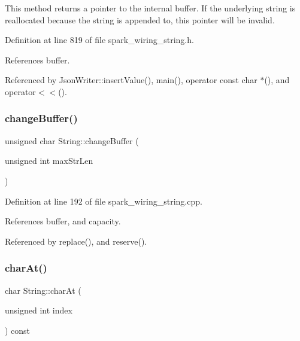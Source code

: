 This method returns a pointer to the internal buffer. If the underlying string is reallocated because the string is appended to, this pointer will be invalid. 

Definition at line 819 of file spark\+\_\+wiring\+\_\+string.\+h.



References buffer.



Referenced by Json\+Writer\+::insert\+Value(), main(), operator const char $\ast$(), and operator$<$$<$().

\mbox{\label{class_string_aea30ddc42b0dd5434d23606c39580e5d}} 
\subsubsection{\texorpdfstring{change\+Buffer()}{changeBuffer()}}
{\footnotesize\ttfamily unsigned char String\+::change\+Buffer (\begin{DoxyParamCaption}\item[{unsigned int}]{max\+Str\+Len }\end{DoxyParamCaption})\hspace{0.3cm}{\ttfamily [protected]}}



Definition at line 192 of file spark\+\_\+wiring\+\_\+string.\+cpp.



References buffer, and capacity.



Referenced by replace(), and reserve().

\mbox{\label{class_string_aee512943b0a68596e1f946fcfda757af}} 
\subsubsection{\texorpdfstring{char\+At()}{charAt()}}
{\footnotesize\ttfamily char String\+::char\+At (\begin{DoxyParamCaption}\item[{unsigned int}]{index }\end{DoxyParamCaption}) const}



